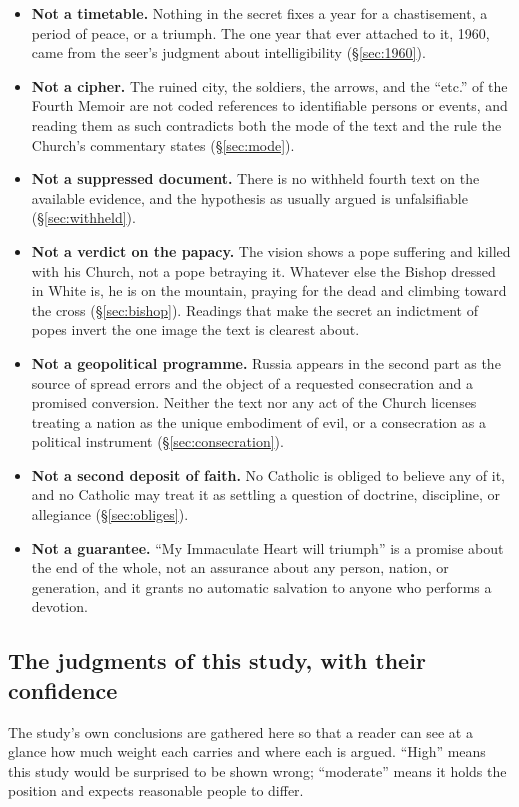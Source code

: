 \begin{itemize}
\item \textbf{Not a timetable.} Nothing in the secret fixes a year
for a chastisement, a period of peace, or a triumph. The one year
that ever attached to it, 1960, came from the seer's judgment about
intelligibility (\S\ref{sec:1960}).
\item \textbf{Not a cipher.} The ruined city, the soldiers, the
arrows, and the ``etc.'' of the Fourth Memoir are not coded
references to identifiable persons or events, and reading them as
such contradicts both the mode of the text and the rule the Church's
commentary states (\S\ref{sec:mode}).
\item \textbf{Not a suppressed document.} There is no withheld
fourth text on the available evidence, and the hypothesis as usually
argued is unfalsifiable (\S\ref{sec:withheld}).
\item \textbf{Not a verdict on the papacy.} The vision shows a pope
suffering and killed with his Church, not a pope betraying it.
Whatever else the Bishop dressed in White is, he is on the mountain,
praying for the dead and climbing toward the cross
(\S\ref{sec:bishop}). Readings that make the secret an indictment of
popes invert the one image the text is clearest about.
\item \textbf{Not a geopolitical programme.} Russia appears in the
second part as the source of spread errors and the object of a
requested consecration and a promised conversion. Neither the text
nor any act of the Church licenses treating a nation as the unique
embodiment of evil, or a consecration as a political instrument
(\S\ref{sec:consecration}).
\item \textbf{Not a second deposit of faith.} No Catholic is obliged
to believe any of it, and no Catholic may treat it as settling a
question of doctrine, discipline, or allegiance
(\S\ref{sec:obliges}).
\item \textbf{Not a guarantee.} ``My Immaculate Heart will triumph''
is a promise about the end of the whole, not an assurance about any
person, nation, or generation, and it grants no automatic salvation
to anyone who performs a devotion.
\end{itemize}

\subsection{The judgments of this study, with their confidence}

The study's own conclusions are gathered here so that a reader can
see at a glance how much weight each carries and where each is
argued. ``High'' means this study would be surprised to be shown
wrong; ``moderate'' means it holds the position and expects
reasonable people to differ.


